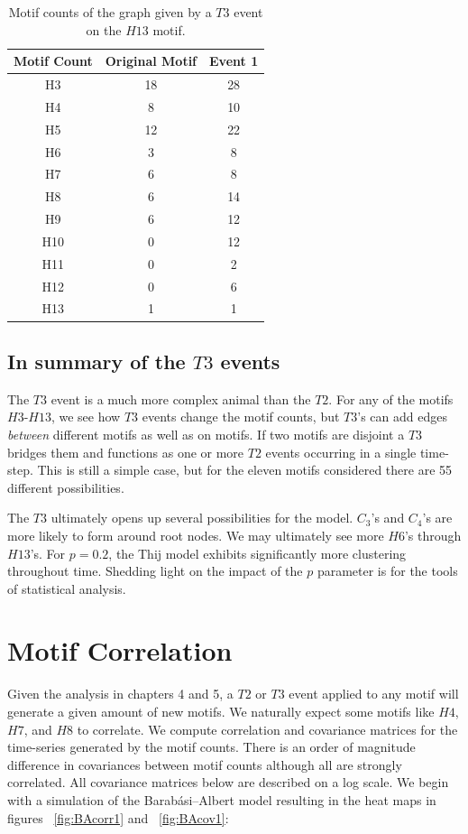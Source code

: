 \begin{table}
    \centering
    \begin{tabular}{||c c c||} 
    \hline
    Motif Count & Original Motif & Event 1\\ [0.5ex] 
    \hline\hline
    H3 & 18 & 28 \\ 
    \hline
    H4 & 8 & 10 \\
    \hline
    H5 & 12 & 22 \\
    \hline
    H6 & 3 & 8 \\
    \hline
    H7 & 6 & 8 \\
    \hline
    H8 & 6 & 14 \\
    \hline
    H9 & 6 & 12 \\
    \hline
    H10 & 0 & 12 \\
    \hline
    H11 & 0 & 2 \\
    \hline
    H12 & 0 & 6 \\
    \hline
    H13 & 1 & 1\\
    \hline
   \end{tabular}
   \caption{Motif counts of the graph given by a $T3$ event on the $H13$ motif.}
   \label{table:22}
\end{table}


\section{In summary of the $T3$ events}

The $T3$ event is a much more complex animal than the $T2$. For any of the motifs $H3$-$H13$,
 we see how $T3$ events change the motif counts, but 
$T3$'s can add edges \textit{between} different motifs as well as on motifs. If two motifs
are disjoint a $T3$ bridges them and functions as one or more $T2$ events occurring in a single 
time-step. This is still a simple case, but for the eleven motifs considered there are 
55 different possibilities. 

The $T3$ ultimately opens up several possibilities for the model. $C_3$'s and $C_4$'s
are more likely to form around root nodes. We may ultimately see more 
$H6$'s through $H13$'s. For $p=0.2$, the
 Thij model exhibits significantly more clustering throughout time. Shedding light on the impact of the $p$
parameter is for the tools of statistical analysis.


\chapter{Motif Correlation}
Given the analysis in chapters 4 and 5, a $T2$ or $T3$ event applied to any motif will generate a given amount of
new motifs. We naturally expect some motifs like $H4$, $H7$, and $H8$ to correlate. We
 compute correlation and covariance matrices for the time-series generated by the motif counts. There is an order of magnitude difference in covariances between
motif counts although all are strongly correlated. All covariance matrices below are described on a log scale.
 We begin with a simulation of the Barabási–Albert model
resulting in the heat maps in figures ~\ref{fig:BAcorr1} and ~\ref{fig:BAcov1}:


